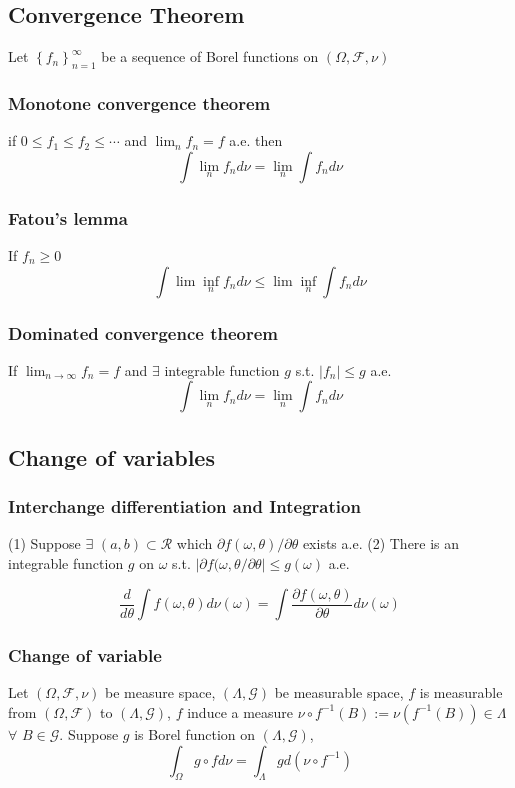 \subsection{Convergence Theorem}
Let $\left\{ f_n \right\}_{n=1}^\infty$ be a sequence of Borel functions on $(\Omega, \mathcal{F}, \nu)$

\subsubsection{Monotone convergence theorem}

if $0\leq f_1 \leq f_2 \leq \cdots$ and $\lim_n f_n = f$ a.e. then
$$\int \lim_n f_n d\nu = \lim_n \int f_n d\nu$$

\subsubsection{Fatou's lemma} If $f_n \geq 0$
$$\int \lim\inf_n f_n d\nu \leq \lim\inf_n \int f_n d\nu$$

\subsubsection{Dominated convergence theorem}
If $\lim_{n\rightarrow \infty} f_n = f $ and $\exists $ integrable function $g$ s.t. $|f_n|\leq g$ a.e.
$$\int\lim_n f_n d\nu = \lim_n \int f_n d\nu$$

\subsection{Change of variables}

\subsubsection{Interchange differentiation and Integration}
(1) Suppose $\exists$ $(a, b)\subset \mathcal{R}$ which $\partial f(\omega,\theta)/\partial\theta$ exists a.e. (2) There is an integrable function $g$ on $\omega$ s.t. $|\partial f(\omega,\theta/\partial\theta|\leq g(\omega)$ a.e.

$$
\frac{d}{d\theta}\int  f(\omega,\theta) d\nu(\omega) = \int \frac{\partial f(\omega, \theta)}{\partial\theta} d\nu(\omega)
$$

\subsubsection{Change of variable}
Let $(\Omega, \mathcal{F}, \nu)$ be measure space, $(\Lambda, \mathcal{G})$ be measurable space, $f$ is measurable from $(\Omega, \mathcal{F})$ to $(\Lambda, \mathcal{G})$, 
$f$ induce a measure $\nu \circ f^{-1}(B) := \nu(f^{-1}(B))\in\Lambda$ $\forall$ $B\in\mathcal{G}$.
Suppose $g$ is Borel function on $(\Lambda, \mathcal{G})$,
$$
\int_\Omega g \circ f d\nu = \int_\Lambda g d (\nu \circ f^{-1})
$$

